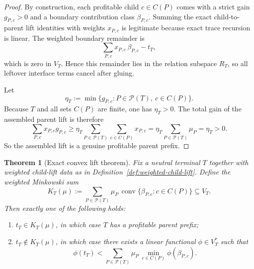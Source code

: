 \documentclass[11pt]{article}
\newtheorem{theorem}{Theorem}[section]
\theoremstyle{definition}
\newcommand{\1}{\mathbf{1}}
\begin{document}
\begin{proof}
By construction, each profitable child $c\in C(P)$ comes with a strict gain $g_{P,c}>0$ and a boundary contribution class $\beta_{P,c}$.
Summing the exact child-to-parent lift identities with weights $x_{P,c}$ is legitimate because exact trace recursion is linear.
The weighted boundary remainder is
\[
\sum_{P,c} x_{P,c}\,\beta_{P,c}-t_T,
\]
which is zero in $V_T$.
Hence this remainder lies in the relation subspace $R_T$, so all leftover interface terms cancel after gluing.

Let
\[
\eta_T:=\min\{g_{P,c}:P\in \mathcal P(T),\ c\in C(P)\}.
\]
Because $T$ and all sets $C(P)$ are finite, one has $\eta_T>0$.
The total gain of the assembled parent lift is therefore
\[
\sum_{P,c} x_{P,c}g_{P,c}
\ge
\eta_T \sum_{P\in \mathcal P(T)} \sum_{c\in C(P)} x_{P,c}
=
\eta_T \sum_{P\in \mathcal P(T)} \mu_P
=
\eta_T
>
0.
\]
So the assembled lift is a genuine profitable parent prefix.
\end{proof}

\begin{theorem}[Exact convex lift theorem]\label{thm:exact-convex-lift}
Fix a neutral terminal $T$ together with weighted child-lift data as in Definition~\ref{def:weighted-child-lift}.
Define the weighted Minkowski sum
\[
K_T(\mu):=
\sum_{P\in \mathcal P(T)} \mu_P\,\operatorname{conv}\{\beta_{P,c}:c\in C(P)\}
\subseteq V_T.
\]
Then exactly one of the following holds:
\begin{enumerate}[label=(\roman*),leftmargin=2.2em]
\item $t_T\in K_T(\mu)$, in which case $T$ has a profitable parent prefix;
\item $t_T\notin K_T(\mu)$, in which case there exists a linear functional $\phi\in V_T^\ast$ such that
\[
\phi(t_T)
<
\sum_{P\in \mathcal P(T)} \mu_P\,\min_{c\in C(P)} \phi(\beta_{P,c}).
\]
\end{enumerate}
\end{theorem}
\end{document}
